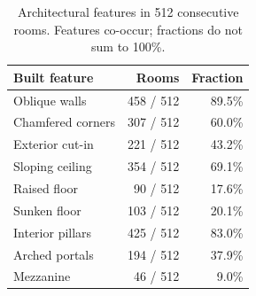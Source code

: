 \begin{table}[ht]\centering\small
\begin{tabular}{lrr}\toprule
Built feature & Rooms & Fraction \\\midrule
Oblique walls & 458 / 512 & 89.5\% \\
Chamfered corners & 307 / 512 & 60.0\% \\
Exterior cut-in & 221 / 512 & 43.2\% \\
Sloping ceiling & 354 / 512 & 69.1\% \\
Raised floor & 90 / 512 & 17.6\% \\
Sunken floor & 103 / 512 & 20.1\% \\
Interior pillars & 425 / 512 & 83.0\% \\
Arched portals & 194 / 512 & 37.9\% \\
Mezzanine & 46 / 512 & 9.0\% \\
\bottomrule\end{tabular}
\caption{Architectural features in 512 consecutive rooms. Features co-occur; fractions do not sum to 100\%.}\label{tab:architecture}
\end{table}
